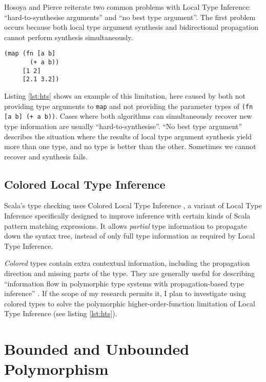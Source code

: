 Hosoya and Pierce \cite{Hosoya99howgood} reiterate two common problems with Local Type Inference:
``hard-to-synthesise arguments'' and ``no best type argument''. The first problem occurs because
both local type argument synthesis and bidirectional propagation cannot perform synthesis
simultaneously. 

\begin{lstlisting}[caption=Hard-to-synthesise expression, label=lst:hts]
(map (fn [a b] 
       (+ a b)) 
     [1 2] 
     [2.1 3.2])
\end{lstlisting}

Listing \ref{lst:hts} shows an example of this limitation,
here caused by both not providing type arguments to \lstinline|map| and not providing the parameter types of \lstinline|(fn [a b] (+ a b))|.
 Cases where both algorithms can simultaneously recover new type information are usually ``hard-to-synthesise''.
``No best type argument'' describes the situation where the results of local
type argument synthesis yield more than one type, and no type is better than the other. Sometimes we cannot recover and synthesis
fails.

\subsection{Colored Local Type Inference}

Scala's type checking uses Colored Local Type Inference \cite{Odersky:2001:CLT:373243.360207},
a variant of Local Type Inference \cite{Pierce:2000:LTI:345099.345100} specifically designed to
improve inference with certain kinds of Scala pattern matching expressions. It allows
\emph{partial} type information to propagate down the syntax tree, instead of only full type information
as required by Local Type Inference.

\emph{Colored} types contain extra contextual information, including the propagation direction
and missing parts of the type. They are generally useful
for describing ``information flow in polymorphic type systems with propagation-based type inference''
\cite{Odersky:2001:CLT:373243.360207}. If the scope of my research permits it, I plan to investigate
using colored types to solve the polymorphic higher-order-function limitation of Local Type Inference
(see listing \ref{lst:hts}).

\section{Bounded and Unbounded Polymorphism}

